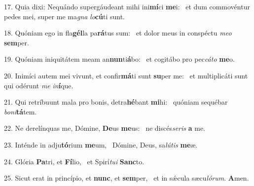 17. Quia dixi: Nequándo supergáudeant mihi ini\textbf{mí}ci \textbf{me}i: \ast\  et dum commovéntur pedes mei, super me ma\textit{gna} \textit{lo}\textbf{cú}ti sunt.\

18. Quóniam ego in fla\textbf{gél}la pa\textbf{rá}tus sum: \ast\  et dolor meus in conspéctu \textit{me}\textit{o} \textbf{sem}per.\

19. Quóniam iniquitátem meam an\textbf{nun}ti\textbf{á}bo: \ast\  et cogitábo pro pec\textit{cá}\textit{to} \textbf{me}o.\

20. Inimíci autem mei vivunt, et confir\textbf{má}ti sunt \textbf{su}per me: \ast\  et multiplicáti sunt qui odérunt \textit{me} \textit{in}\textbf{í}que.\

21. Qui retríbuunt mala pro bonis, detra\textbf{hé}bant \textbf{mi}hi: \ast\  quóniam sequébar \textit{bo}\textit{ni}\textbf{tá}tem.\

22. Ne derelínquas me, Dómine, \textbf{De}us \textbf{me}us: \ast\  ne discés\textit{se}\textit{ris} \textbf{a} me.\

23. Inténde in adju\textbf{tó}rium \textbf{me}um, \ast\  Dómine, Deus, sa\textit{lú}\textit{tis} \textbf{me}æ.\

24. Glória \textbf{Pa}tri, et \textbf{Fí}lio, \ast\  et Spirí\textit{tu}\textit{i} \textbf{Sanc}to.\

25. Sicut erat in princípio, et \textbf{nunc}, et \textbf{sem}per, \ast\  et in sǽcula sæcu\textit{ló}\textit{rum}. \textbf{A}men.\

